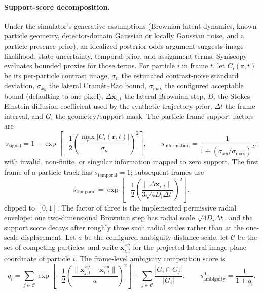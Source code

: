 \paragraph{Support-score decomposition.}
Under the simulator's generative assumptions (Brownian latent dynamics, known particle geometry, detector-domain Gaussian or locally Gaussian noise, and a particle-presence prior), an idealized posterior-odds argument suggests image-likelihood, state-uncertainty, temporal-prior, and assignment terms. Syniscopy evaluates bounded proxies for those terms. For particle $i$ in frame $t$, let $C_i(\mathbf{r},t)$ be its per-particle contrast image, $\sigma_n$ the estimated contrast-noise standard deviation, $\sigma_{xy}$ the lateral Cram\'{e}r--Rao bound, $\sigma_{\max}$ the configured acceptable bound (defaulting to one pixel), $\Delta\mathbf{x}_{i,t}$ the lateral Brownian step, $D_i$ the Stokes--Einstein diffusion coefficient used by the synthetic trajectory prior, $\Delta t$ the frame interval, and $G_i$ the geometry/support mask. The particle-frame support factors are
\begin{equation}
  s_{\mathrm{signal}}
  =
  1-\exp\!\left[-\frac{1}{2}
  \left(\frac{\max_{\mathbf{r}} |C_i(\mathbf{r},t)|}{\sigma_n}\right)^2\right],
  \qquad
  s_{\mathrm{information}}
  =
  \frac{1}{1+(\sigma_{xy}/\sigma_{\max})^2},
\end{equation}
with invalid, non-finite, or singular information mapped to zero support. The first frame of a particle track has $s_{\mathrm{temporal}}=1$; subsequent frames use
\begin{equation}
  s_{\mathrm{temporal}}
  =
  \exp\!\left[
  -\frac{1}{2}
  \left(
  \frac{\lVert\Delta\mathbf{x}_{i,t}\rVert}
  {3\sqrt{4D_i\Delta t}}
  \right)^2
  \right],
\end{equation}
clipped to $[0,1]$. The factor of three is the implemented permissive radial envelope: one two-dimensional Brownian step has radial scale $\sqrt{4D_i\Delta t}$, and the support score decays after roughly three such radial scales rather than at the one-scale displacement. Let $a$ be the configured ambiguity-distance scale, let $\mathcal{C}$ be the set of competing particles, and write $\mathbf{x}_{i,t}^{xy}$ for the projected lateral image-plane coordinate of particle $i$. The frame-level ambiguity competition score is
\begin{equation}
  q_i =
  \sum_{j\in\mathcal{C}}
  \exp\!\left[-\frac{1}{2}
  \left(\frac{\lVert\mathbf{x}_{j,t}^{xy}-\mathbf{x}_{i,t}^{xy}\rVert}{a}\right)^2\right]
  +
  \sum_{j\in\mathcal{C}}
  \frac{|G_i\cap G_j|}{|G_i|},
  \qquad
  s_{\mathrm{ambiguity}}^{0}=\frac{1}{1+q_i}.
\end{equation}
